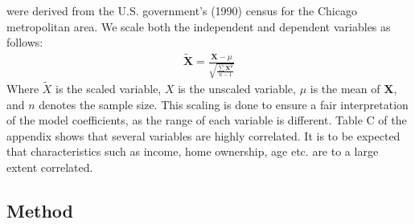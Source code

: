 \documentclass[
]{article}
\begin{document}
were derived from the U.S. government's (1990) census for the Chicago
metropolitan area. We scale both the independent and dependent variables
as follows:\\
\begin{align*}
\mathbf{\tilde{X}} = \frac{\mathbf{X} - \mu}{\sqrt{\frac{\sum \boldsymbol{\mathbf{X}^2}}{n-1}}}
\end{align*} Where \(\tilde{X}\) is the scaled variable, \(X\) is the
unscaled variable, \(\mu\) is the mean of \(\boldsymbol{X}\), and \(n\)
denotes the sample size. This scaling is done to ensure a fair
interpretation of the model coefficients, as the range of each variable
is different. Table C of the appendix shows that several variables are
highly correlated. It is to be expected that characteristics such as
income, home ownership, age etc. are to a large extent correlated.

\hypertarget{method}{%
\subsection{Method}\label{method}}
\end{document}
